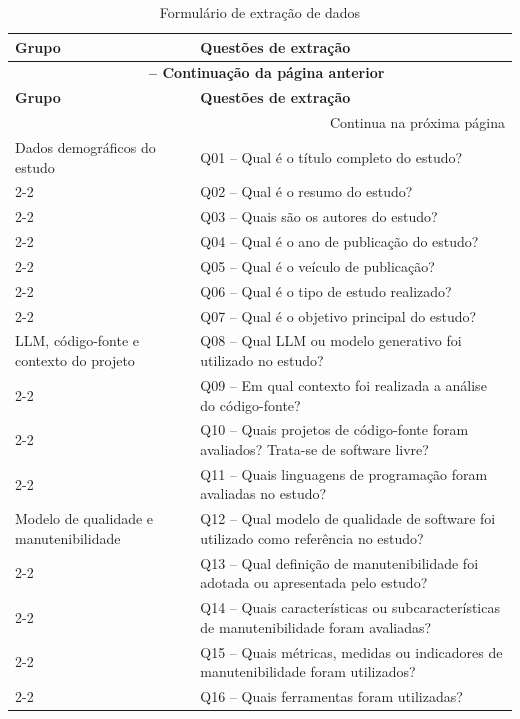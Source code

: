 \begin{longtable}{|p{3.5cm}|p{11cm}|}
\caption{Formulário de extração de dados} \label{tab:formulario_extracao} \\
\hline
\textbf{Grupo} & \textbf{Questões de extração} \\ \hline
\endfirsthead

\multicolumn{2}{c}{{\bfseries \tablename\ \thetable{} -- Continuação da página anterior}} \\ \hline
\textbf{Grupo} & \textbf{Questões de extração} \\ \hline
\endhead

\hline \multicolumn{2}{r}{{Continua na próxima página}} \\
\endfoot

\hline
\endlastfoot

Dados demográficos do estudo & Q01 -- Qual é o título completo do estudo? \\ \cline{2-2}
 & Q02 -- Qual é o resumo do estudo? \\ \cline{2-2}
 & Q03 -- Quais são os autores do estudo? \\ \cline{2-2}
 & Q04 -- Qual é o ano de publicação do estudo? \\ \cline{2-2}
 & Q05 -- Qual é o veículo de publicação? \\ \cline{2-2}
 & Q06 -- Qual é o tipo de estudo realizado? \\ \cline{2-2}
 & Q07 -- Qual é o objetivo principal do estudo? \\ \hline

LLM, código-fonte e contexto do projeto & Q08 -- Qual LLM ou modelo generativo foi utilizado no estudo? \\ \cline{2-2}
 & Q09 -- Em qual contexto foi realizada a análise do código-fonte? \\ \cline{2-2}
 & Q10 -- Quais projetos de código-fonte foram avaliados? Trata-se de software livre? \\ \cline{2-2}
 & Q11 -- Quais linguagens de programação foram avaliadas no estudo? \\ \hline

Modelo de qualidade e manutenibilidade & Q12 -- Qual modelo de qualidade de software foi utilizado como referência no estudo? \\ \cline{2-2}
 & Q13 -- Qual definição de manutenibilidade foi adotada ou apresentada pelo estudo? \\ \cline{2-2}
 & Q14 -- Quais características ou subcaracterísticas de manutenibilidade foram avaliadas? \\ \cline{2-2}
 & Q15 -- Quais métricas, medidas ou indicadores de manutenibilidade foram utilizados? \\ \cline{2-2}
 & Q16 -- Quais ferramentas foram utilizadas? \\ \hline


\end{longtable}
